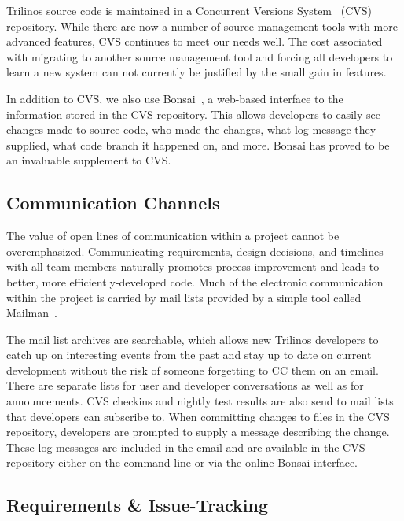 \documentclass[12pt,relax]{article}
\begin{document}
Trilinos source code is maintained in a Concurrent Versions System~\cite{CVS}
(CVS) repository.  While there are now a number of source management tools
with more advanced features, CVS continues to meet our needs well.  The cost
associated with migrating to another source management tool and forcing all
developers to learn a new system can not currently be justified by the small
gain in features.

In addition to CVS, we also use Bonsai~\cite{Bonsai}, a web-based interface to
the information stored in the CVS repository.  This allows developers to easily
see changes made to source code, who made the changes, what log message they
supplied, what code branch it happened on, and more.  Bonsai has proved to be
an invaluable supplement to CVS.

\subsection{Communication Channels}


The value of open lines of communication within a project cannot be 
overemphasized.  Communicating requirements, design decisions, and timelines 
with all team members naturally promotes process improvement and leads to
better, more efficiently-developed code.  Much of the electronic communication
within the project is carried by mail lists provided by a simple tool called
Mailman~\cite{Mailman}.

The mail list archives are searchable, which allows new Trilinos developers 
to catch up on interesting events from the past and stay up to date on current
development without the risk of someone forgetting to CC them on an email.  
There are separate lists for user and developer conversations as well as for
announcements.  CVS checkins and nightly test results are also send to mail
lists that developers can subscribe to.  When committing changes to files in
the CVS repository, developers are prompted to supply a message describing the
change.  These log messages are included in the email and are available in the
CVS repository either on the command line or via the online Bonsai interface.

\subsection{Requirements \& Issue-Tracking}
\end{document}
